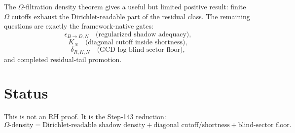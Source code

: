 \documentclass[11pt]{article}
\begin{document}
The $\Omega$-filtration density theorem gives a useful but limited positive result:
finite $\Omega$ cutoffs exhaust the Dirichlet-readable part of the residual class.
The remaining questions are exactly the framework-native gates:
\[
\epsilon_{B\to D,N}\quad
\text{(regularized shadow adequacy)},
\]
\[
K_N\quad
\text{(diagonal cutoff inside shortness)},
\]
\[
\delta_{R,K,N}\quad
\text{(GCD-log blind-sector floor)},
\]
and completed residual-tail promotion.

\section{Status}

This is not an RH proof. It is the Step-143 reduction:
\[
\Omega\text{-density}
=
\text{Dirichlet-readable shadow density}
+
\text{diagonal cutoff/shortness}
+
\text{blind-sector floor}.
\]
\end{document}
